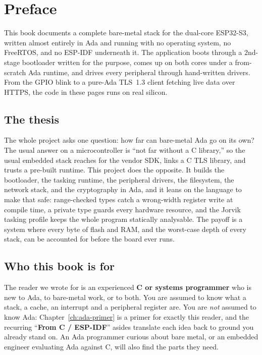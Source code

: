 \chapter*{Preface}
\label{ch:preface}

This book documents a complete bare-metal stack for the dual-core ESP32-S3,
written almost entirely in Ada and running with no operating system, no FreeRTOS,
and no ESP-IDF underneath it. The application boots through a 2nd-stage bootloader
written for the purpose, comes up on both cores under a from-scratch Ada runtime,
and drives every peripheral through hand-written drivers. From the GPIO blink to a
pure-Ada TLS~1.3 client fetching live data over HTTPS, the code in these pages runs
on real silicon.

\section*{The thesis}

The whole project asks one question: how far can bare-metal Ada go on its own? The
usual answer on a microcontroller is ``not far without a C library,'' so the usual
embedded stack reaches for the vendor SDK, links a C TLS library, and trusts a
pre-built runtime. This project does the opposite. It builds the bootloader, the
tasking runtime, the peripheral drivers, the filesystem, the network stack, and the
cryptography in Ada, and it leans on the language to make that safe: range-checked
types catch a wrong-width register write at compile time, a private type guards
every hardware resource, and the Jorvik tasking profile keeps the whole program
statically analysable. The payoff is a system where every byte of flash and RAM,
and the worst-case depth of every stack, can be accounted for before the board ever
runs.

\section*{Who this book is for}

The reader we wrote for is an experienced \textbf{C or systems programmer} who is
new to Ada, to bare-metal work, or to both. You are assumed to know what a stack, a
cache, an interrupt and a peripheral register are. You are \emph{not} assumed to
know Ada: Chapter~\ref{ch:ada-primer} is a primer for exactly this reader, and the
recurring ``\textbf{From C / ESP-IDF}'' asides translate each idea back to ground you
already stand on. An Ada programmer curious about bare metal, or an embedded
engineer evaluating Ada against C, will also find the parts they need.

